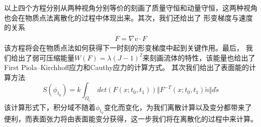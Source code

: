 以上四个方程分别从两种视角分别等价的刻画了质量守恒和动量守恒，这两种视角也会在物质点法离散化的过程中体现出来。其次，我们还给出了
形变梯度与速度的关系
\begin{align*}
    \dot{F} = \nabla v \cdot F
\end{align*}
该方程将会在物质点法如何获得下一时刻的形变梯度中起到关键作用。最后，
我们给出了弱可压缩能量$W(F)=\lambda (J-1)^2$来刻画流体的特性，该能量也给出了First Piola–Kirchhoff应力和Cauthy应力的计算方式。
其次我们给出了表面能的计算方法
$$S(\phi_{t_0}) = k \int_{\Omega_{t_1}} det(F(x;t_0,t_1)) \Vert F^{-T}(x;t_0,t_1)\tilde{n}\Vert d\tilde{s}$$
该计算形式下，积分域不随着$\phi_{t_0}$变化而变化，为我们离散计算以及变分都带来了便利，而表面张力将由表面能变分获得，这一步我们将在离散化的过程中来计算。







